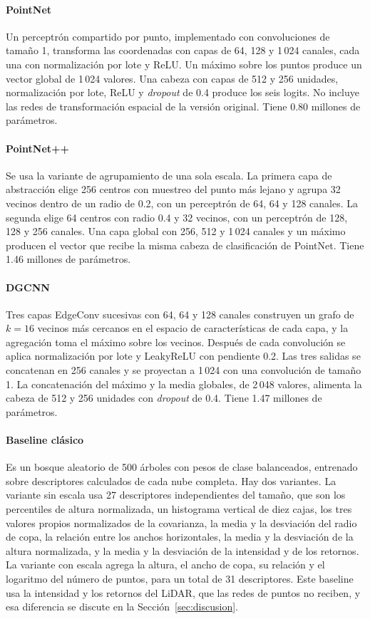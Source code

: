 \documentclass[preprint,12pt]{elsarticle}
\begin{document}
\paragraph{PointNet}
Un perceptrón compartido por punto, implementado con convoluciones de tamaño 1, transforma las coordenadas con capas de 64, 128 y 1\,024 canales, cada una con normalización por lote y ReLU. Un máximo sobre los puntos produce un vector global de 1\,024 valores. Una cabeza con capas de 512 y 256 unidades, normalización por lote, ReLU y \textit{dropout} de 0.4 produce los seis logits. No incluye las redes de transformación espacial de la versión original. Tiene 0.80 millones de parámetros.

\paragraph{PointNet++}
Se usa la variante de agrupamiento de una sola escala. La primera capa de abstracción elige 256 centros con muestreo del punto más lejano y agrupa 32 vecinos dentro de un radio de 0.2, con un perceptrón de 64, 64 y 128 canales. La segunda elige 64 centros con radio 0.4 y 32 vecinos, con un perceptrón de 128, 128 y 256 canales. Una capa global con 256, 512 y 1\,024 canales y un máximo producen el vector que recibe la misma cabeza de clasificación de PointNet. Tiene 1.46 millones de parámetros.

\paragraph{DGCNN}
Tres capas EdgeConv sucesivas con 64, 64 y 128 canales construyen un grafo de $k=16$ vecinos más cercanos en el espacio de características de cada capa, y la agregación toma el máximo sobre los vecinos. Después de cada convolución se aplica normalización por lote y LeakyReLU con pendiente 0.2. Las tres salidas se concatenan en 256 canales y se proyectan a 1\,024 con una convolución de tamaño 1. La concatenación del máximo y la media globales, de 2\,048 valores, alimenta la cabeza de 512 y 256 unidades con \textit{dropout} de 0.4. Tiene 1.47 millones de parámetros.

\paragraph{Baseline clásico}
Es un bosque aleatorio \cite{breiman2001rf} de 500 árboles con pesos de clase balanceados, entrenado sobre descriptores calculados de cada nube completa. Hay dos variantes. La variante sin escala usa 27 descriptores independientes del tamaño, que son los percentiles de altura normalizada, un histograma vertical de diez cajas, los tres valores propios normalizados de la covarianza, la media y la desviación del radio de copa, la relación entre los anchos horizontales, la media y la desviación de la altura normalizada, y la media y la desviación de la intensidad y de los retornos. La variante con escala agrega la altura, el ancho de copa, su relación y el logaritmo del número de puntos, para un total de 31 descriptores. Este baseline usa la intensidad y los retornos del LiDAR, que las redes de puntos no reciben, y esa diferencia se discute en la Sección~\ref{sec:discusion}.
\end{document}
